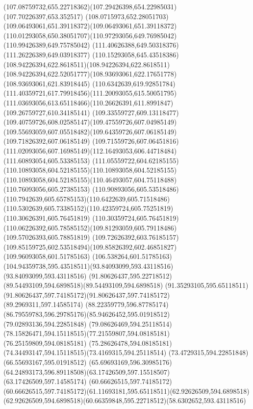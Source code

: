 {{\curveto(107.08759732,655.22718362)(107.29426398,654.22985031)(107.70226397,653.352517)
\curveto(108.0715973,652.28051703)(109.06493061,651.39118372)(109.06493061,651.39118372)
\curveto(110.01293058,650.38051707)(110.97293056,649.76985042)(110.99426389,649.75785042)
\lineto(111.40626388,649.50318376)
\lineto(111.26226389,649.03918377)
\curveto(110.15293058,645.43518386)(108.94226394,622.8618511)(108.94226394,622.8618511)
\curveto(108.94226394,622.52051777)(108.93693061,622.17651778)(108.93693061,621.83918445)
\curveto(110.6342639,619.92851784)(111.40359721,617.79918456)(111.20093055,615.50051795)
\curveto(111.03693056,613.65118466)(110.26626391,611.8991847)(109.26759727,610.34185141)
\curveto(109.33559727,609.13118477)(109.40759726,608.02585147)(109.47559726,607.04985149)
\curveto(109.55693059,607.05518482)(109.64359726,607.06185149)(109.71826392,607.06185149)
\lineto(109.71559726,607.06451816)
\curveto(111.02093056,607.16985149)(112.16493053,606.44718484)(111.60893054,605.53385153)
\curveto(111.05559722,604.62185155)(110.10893058,604.52185155)(110.10893058,604.52185155)
\curveto(110.10893058,604.52185155)(110.46493057,604.75118488)(110.76093056,605.27385153)
\curveto(110.90893056,605.53518486)(110.7942639,605.65785153)(110.6422639,605.71518486)
\curveto(110.5302639,605.73385152)(110.42359724,605.75251819)(110.30626391,605.76451819)
\lineto(110.30359724,605.76451819)
\curveto(110.06226392,605.78585152)(109.81293059,605.79118486)(109.57026393,605.78851819)
\curveto(109.72626392,603.76185157)(109.85159725,602.53518494)(109.85826392,602.46851827)
\lineto(109.96093058,601.51785163)
\lineto(106.538264,601.51785163)
\curveto(104.94359738,595.43518511)(93.84093099,593.43118516)(93.84093099,593.43118516)
\curveto(91.80626437,595.22718512)(89.54493109,594.6898518)(89.54493109,594.6898518)
\curveto(91.35293105,595.65118511)(91.80626437,597.74185172)(91.80626437,597.74185172)
\lineto(89.2969311,597.14585174)
\curveto(88.22359779,596.87785174)(86.79559783,596.29785176)(85.94626452,595.01918512)
\lineto(79.02893136,594.22851848)
\lineto(79.08626469,594.25118514)
\curveto(78.15826471,594.15118515)(77.21559807,594.08185181)(76.25159809,594.08185181)
\curveto(75.28626478,594.08185181)(74.34493147,594.15118515)(73.4169315,594.25118514)
\lineto(73.4729315,594.22851848)
\lineto(66.55693167,595.01918512)
\curveto(65.69693169,596.30985176)(64.24893173,596.89118508)(63.17426509,597.15518507)
\lineto(63.17426509,597.14585174)
\lineto(60.66626515,597.74185172)
\curveto(60.66626515,597.74185172)(61.11693181,595.65118511)(62.92626509,594.6898518)
\curveto(62.92626509,594.6898518)(60.66359848,595.22718512)(58.6302652,593.43118516)
}}

